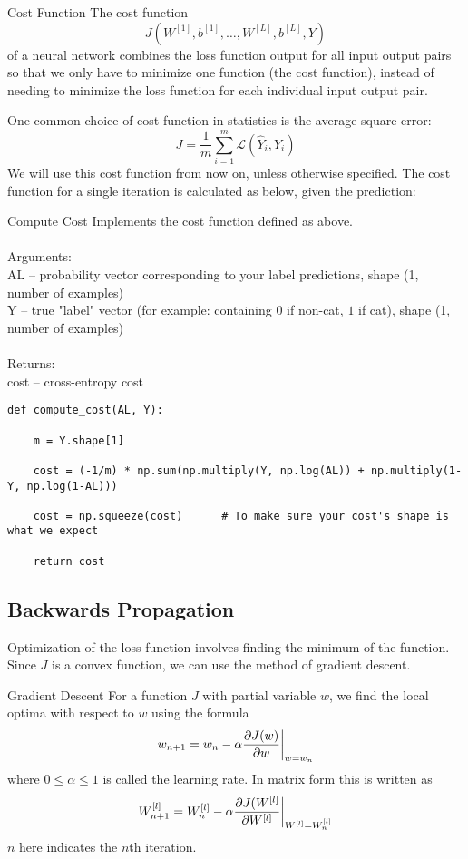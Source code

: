 \documentclass[a4paper]{article}
\begin{document}
\begin{enumerate}
\begin{defn}{Cost Function}{} The cost function $$J(W^{[1]},b^{[1]},\dots,W^{[L]},b^{[L]},Y)$$ of a neural network combines the loss function output for all input output pairs so that we only have to minimize one function (the cost function), instead of needing to minimize the loss function for each individual input output pair. 
\end{defn}

One common choice of cost function in statistics is the average square error: $$J=\frac{1}{m}\sum_{i=1}^m\mathcal{L}(\hat{Y}_i,Y_i)$$ We will use this cost function from now on, unless otherwise specified. The cost function for a single iteration is calculated as below, given the prediction: 

\begin{alg}{Compute Cost}{} Implements the cost function defined as above. \\~\\
Arguments: \\
AL -- probability vector corresponding to your label predictions, shape (1, number of examples)\\
Y -- true "label" vector (for example: containing $0$ if non-cat, $1$ if cat), shape (1, number of examples)\\~\\

Returns: \\
cost  -- cross-entropy cost
\begin{verbatim}
def compute_cost(AL, Y):

    m = Y.shape[1]

    cost = (-1/m) * np.sum(np.multiply(Y, np.log(AL)) + np.multiply(1-Y, np.log(1-AL)))
    
    cost = np.squeeze(cost)      # To make sure your cost's shape is what we expect

    return cost
\end{verbatim}
\end{alg}

\subsection{Backwards Propagation}
Optimization of the loss function involves finding the minimum of the function. Since $J$ is a convex function, we can use the method of gradient descent. 

\begin{defn}{Gradient Descent}{} For a function $J$ with partial variable $w$, we find the local optima with respect to $w$ using the formula $$w_{n+1}=w_n-\alpha\frac{\partial J(w)}{\partial w}\bigg{|}_{w=w_n}$$ where $0\leq\alpha\leq 1$ is called the learning rate. In matrix form this is written as $$W_{n+1}^{[l]}=W_n^{[l]}-\alpha\frac{\partial J(W^{[l]}}{\partial W^{[l]}}\bigg{|}_{W^{[l]}=W_n^{[l]}}$$ $n$ here indicates the $n$th iteration. 
\end{defn}


\end{enumerate}
\end{document}
